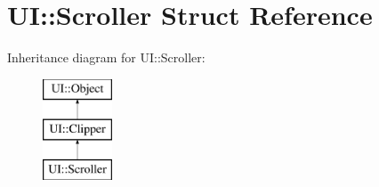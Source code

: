 \hypertarget{struct_u_i_1_1_scroller}{}\section{UI\+:\+:Scroller Struct Reference}
\label{struct_u_i_1_1_scroller}
Inheritance diagram for UI\+:\+:Scroller\+:\begin{figure}[H]
\begin{center}
\leavevmode
\includegraphics[height=3.000000cm]{struct_u_i_1_1_scroller}
\end{center}
\end{figure}
